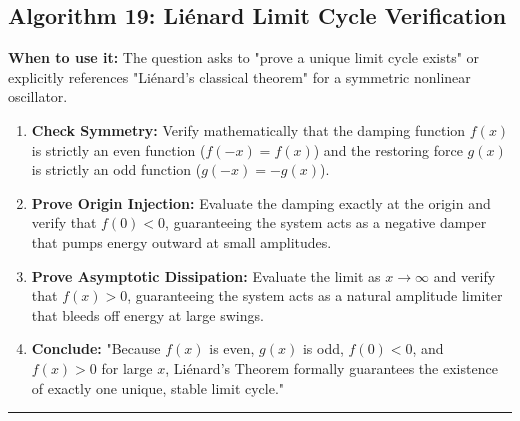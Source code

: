 \documentclass[11pt, a4paper]{report}
\begin{document}
\subsection*{Algorithm 19: Liénard Limit Cycle Verification}
\textbf{When to use it:} The question asks to "prove a unique limit cycle exists" or explicitly references "Liénard's classical theorem" for a symmetric nonlinear oscillator.
\begin{enumerate}[label=\textbf{\arabic*.}]
    \item \textbf{Check Symmetry:} Verify mathematically that the damping function $f(x)$ is strictly an even function ($f(-x) = f(x)$) and the restoring force $g(x)$ is strictly an odd function ($g(-x) = -g(x)$).
    \item \textbf{Prove Origin Injection:} Evaluate the damping exactly at the origin and verify that $f(0) < 0$, guaranteeing the system acts as a negative damper that pumps energy outward at small amplitudes.
    \item \textbf{Prove Asymptotic Dissipation:} Evaluate the limit as $x \to \infty$ and verify that $f(x) > 0$, guaranteeing the system acts as a natural amplitude limiter that bleeds off energy at large swings.
    \item \textbf{Conclude:} "Because $f(x)$ is even, $g(x)$ is odd, $f(0) < 0$, and $f(x) > 0$ for large $x$, Liénard's Theorem formally guarantees the existence of exactly one unique, stable limit cycle."
\end{enumerate}
\vspace{1em}
\noindent\rule{\textwidth}{0.4pt}
\vspace{1em}
\end{document}
